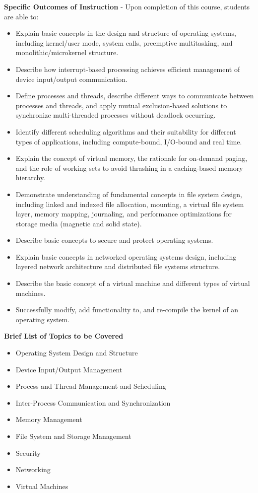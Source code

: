 \documentclass{article}
\begin{document}
\noindent \textbf{Specific Outcomes of Instruction} - Upon completion of this course, students are able to: \\
\begin{itemize}
    \item Explain basic concepts in the design and structure of operating systems, including kernel/user mode, system calls, preemptive multitasking, and monolithic/microkernel structure.
    \item Describe how interrupt-based processing achieves efficient management of device input/output communication.
    \item Define processes and threads, describe different ways to communicate between processes and threads, and apply mutual exclusion-based solutions to synchronize multi-threaded processes without deadlock occurring.
    \item Identify different scheduling algorithms and their suitability for different types of applications, including compute-bound, I/O-bound and real time.
    \item Explain the concept of virtual memory, the rationale for on-demand paging, and the role of working sets to avoid thrashing in a caching-based memory hierarchy.
    \item Demonstrate understanding of fundamental concepts in file system design, including linked and indexed file allocation, mounting, a virtual file system layer, memory mapping, journaling, and performance optimizations for storage media (magnetic and solid state).
    \item Describe basic concepts to secure and protect operating systems.
    \item Explain basic concepts in networked operating systems design, including layered network architecture and distributed file systems structure.
    \item Describe the basic concept of a virtual machine and different types of virtual machines.
    \item Successfully modify, add functionality to, and re-compile the kernel of an operating system.
\end{itemize}

\noindent \textbf{Brief List of Topics to be Covered}
\begin{itemize}
    \item Operating System Design and Structure
    \item Device Input/Output Management
    \item Process and Thread Management and Scheduling
    \item Inter-Process Communication and Synchronization
    \item Memory Management
    \item File System and Storage Management
    \item Security
    \item Networking
    \item Virtual Machines
\end{itemize}
\end{document}

